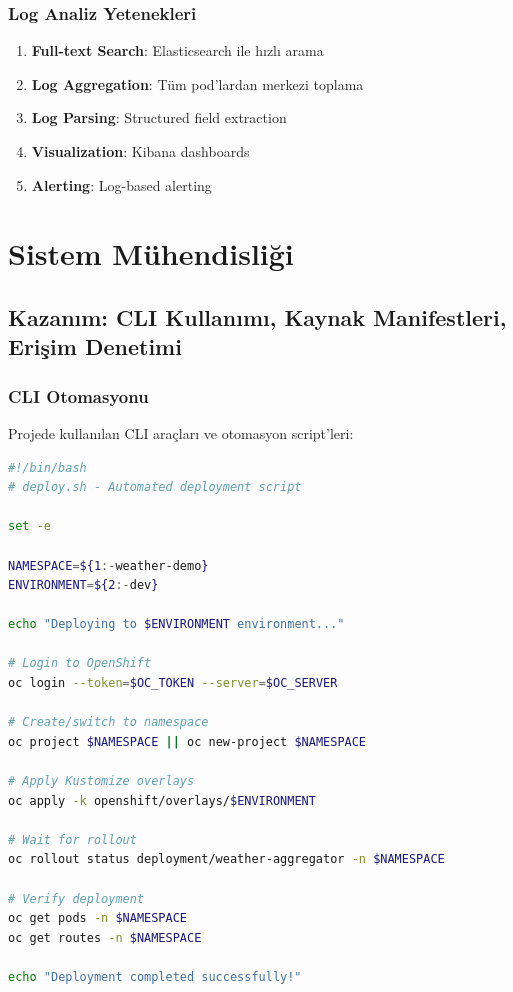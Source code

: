\documentclass[12pt,a4paper]{article}
\begin{document}
\subsubsection{Log Analiz Yetenekleri}

\begin{enumerate}
    \item \textbf{Full-text Search}: Elasticsearch ile hızlı arama
    \item \textbf{Log Aggregation}: Tüm pod'lardan merkezi toplama
    \item \textbf{Log Parsing}: Structured field extraction
    \item \textbf{Visualization}: Kibana dashboards
    \item \textbf{Alerting}: Log-based alerting
\end{enumerate}

\section{Sistem Mühendisliği}

\subsection{Kazanım: CLI Kullanımı, Kaynak Manifestleri, Erişim Denetimi}

\subsubsection{CLI Otomasyonu}

Projede kullanılan CLI araçları ve otomasyon script'leri:

\begin{lstlisting}[language=bash, caption=Deployment Script]
#!/bin/bash
# deploy.sh - Automated deployment script

set -e

NAMESPACE=${1:-weather-demo}
ENVIRONMENT=${2:-dev}

echo "Deploying to $ENVIRONMENT environment..."

# Login to OpenShift
oc login --token=$OC_TOKEN --server=$OC_SERVER

# Create/switch to namespace
oc project $NAMESPACE || oc new-project $NAMESPACE

# Apply Kustomize overlays
oc apply -k openshift/overlays/$ENVIRONMENT

# Wait for rollout
oc rollout status deployment/weather-aggregator -n $NAMESPACE

# Verify deployment
oc get pods -n $NAMESPACE
oc get routes -n $NAMESPACE

echo "Deployment completed successfully!"
\end{lstlisting}
\end{document}

